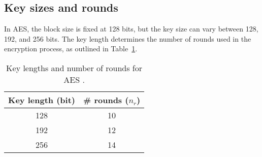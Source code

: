 \subsection{Key sizes and rounds}

In \gls{AES}, the block size is fixed at 128 bits, but the key size can vary between 128, 192, and 256 bits. 
The key length determines the number of rounds used in the encryption process, as outlined in Table~\ref{table:key-length-rounds}.

\begin{table}[h]
    \centering
    \begin{tabular}{c|c}
        \textbf{Key length (bit)} & \textbf{\# rounds ($n_r$)} \\ 
        \hline
        128 & 10 \\  
        192 & 12 \\  
        256 & 14 \\  
    \end{tabular}
    \caption{Key lengths and number of rounds for AES \cite{Paar2024}.}
    \label{table:key-length-rounds}
\end{table}

